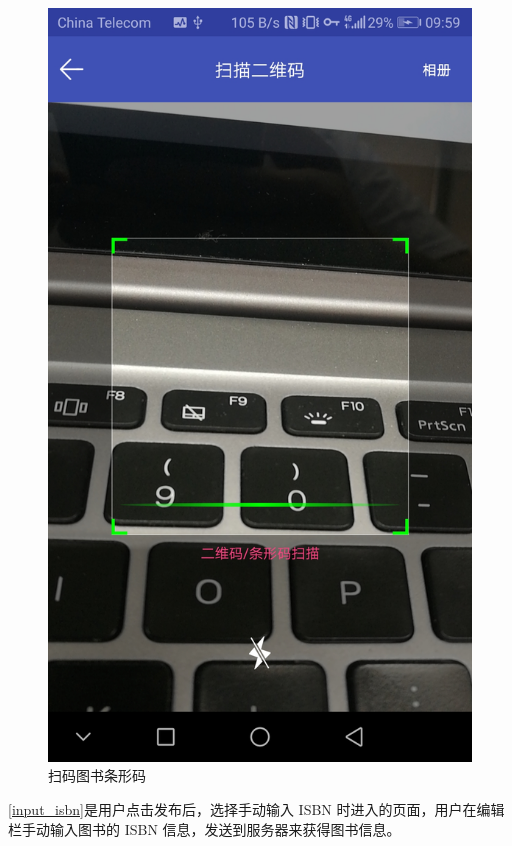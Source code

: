 \begin{figure}[h]
	\centering
	\includegraphics[scale=0.09]{Chapters/UI/scan.jpg}
	\caption{扫码图书条形码}
	\label{scan}
\end{figure}

\cref{input_isbn}是用户点击发布后，选择手动输入 ISBN 时进入的页面，用户在编辑栏手动输入图书的 ISBN 信息，发送到服务器来获得图书信息。

